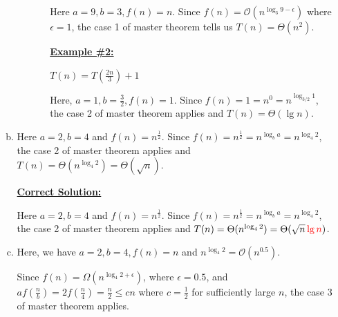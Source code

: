 \documentclass[12pt]{article}
\begin{document}
\begin{enumerate}[1.]
\begin{enumerate}[a)]
\begin{itemize}
\begin{itemize}
                Here $a = 9, b = 3, f(n) = n$. Since $f(n) = \mathcal{O}(n^{\log_3 9 - \epsilon})$
                where $\epsilon = 1$, the case 1 of master theorem tells us $T(n) = \Theta(n^2)$.

                \bigskip

                \underline{\textbf{Example \#2:}}

                \bigskip

                $T(n) = T(\frac{2n}{3}) + 1$

                \bigskip

                Here, $a = 1, b = \frac{3}{2}, f(n) = 1$. Since $f(n) = 1 = n^0 = n^{\log_{3/2} 1}$,
                the case 2 of master theorem applies and $T(n) = \Theta(\lg n)$.

            \end{itemize}
        \end{itemize}

        \bigskip

        \item

        Here $a = 2, b = 4$ and $f(n) = n^{\frac{1}{2}}$. Since $f(n) = n^{\frac{1}{2}} = n^{\log_b a} = n^{\log_4 2}$,
        the case 2 of master theorem applies and $T(n) = \Theta(n^{\log_4 2}) = \Theta(\sqrt{n})$.

        \bigskip

        \begin{mdframed}
            \underline{\textbf{Correct Solution:}}

            \bigskip

            Here $a = 2, b = 4$ and $f(n) = n^{\frac{1}{2}}$. Since $f(n) = n^{\frac{1}{2}} = n^{\log_b a} = n^{\log_4 2}$,
        the case 2 of master theorem applies and $T(n) = \Theta(n^{\log_4 2}) = \Theta(\sqrt{n}\color{red}\lg n\color{black})$.

        \end{mdframed}

        \bigskip

        \item

        Here, we have $a = 2, b = 4, f(n) = n$ and $n^{\log_4 2} = \mathcal{O}(n^{0.5})$.

        \bigskip

        Since $f(n) = \Omega(n^{\log_4 2 + \epsilon})$, where $\epsilon = 0.5$, and
        $af(\frac{n}{b}) = 2 f (\frac{n}{4}) = \frac{n}{2} \leq cn$ where $c = \frac{1}{2}$
        for sufficiently large $n$, the case 3 of master theorem applies.


\end{enumerate}
\end{enumerate}
\end{document}
